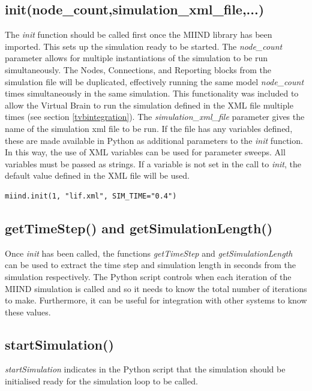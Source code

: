 \documentclass[utf8]{frontiersSCNS} %
\begin{document}
\subsection{init(node\_count,simulation\_xml\_file,...)}
The \textit{init} function should be called first once the MIIND library has been imported. This sets up the simulation ready to be started. The \textit{node\_count} parameter allows for multiple instantiations of the simulation to be run simultaneously. The Nodes, Connections, and Reporting blocks from the simulation file will be duplicated, effectively running the same model \textit{node\_count} times simultaneously in the same simulation. This functionality was included to allow the Virtual Brain to run the simulation defined in the XML file multiple times (see section \ref{tvbintegration}). The \textit{simulation\_xml\_file} parameter gives the name of the simulation xml file to be run. If the file has any variables defined, these are made available in Python as additional parameters to the \textit{init} function. In this way, the use of XML variables can be used for parameter sweeps. All variables must be passed as strings. If a variable is not set in the call to \textit{init}, the default value defined in the XML file will be used.

\begin{lstlisting}[caption={Calling init for a MIIND simulation lif.xml with the Variable SIM\_TIME set to 0.4.}]
miind.init(1, "lif.xml", SIM_TIME="0.4")
\end{lstlisting}

\subsection{getTimeStep() and getSimulationLength()}
Once \textit{init} has been called, the functions \textit{getTimeStep} and \textit{getSimulationLength} can be used to extract the time step and simulation length in seconds from the simulation respectively. The Python script controls when each iteration of the MIIND simulation is called and so it needs to know the total number of iterations to make. Furthermore, it can be useful for integration with other systems to know these values.

\subsection{startSimulation()}
\textit{startSimulation} indicates in the Python script that the simulation should be initialised ready for the simulation loop to be called.
\end{document}
